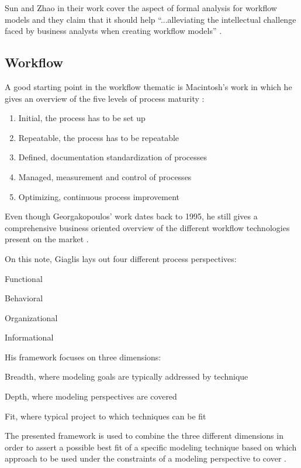 \documentclass{seal_thesis}
\begin{document}
Sun and Zhao in their work cover the aspect of formal analysis for workflow models and they claim that it should help ``...alleviating the intellectual challenge faced by business analysts when creating workflow models'' \cite{Sun2013}.

\subsection{Workflow}
\label{subsec:workflow}

A good starting point in the workflow thematic is Macintosh's work in which he gives an overview of the five levels of process maturity \cite{Macintosh1993}:

\begin{enumerate}
	\item Initial, the process has to be set up
	\item Repeatable, the process has to be repeatable
	\item Defined, documentation standardization of processes
	\item Managed, measurement and control of processes
	\item Optimizing, continuous process improvement
\end{enumerate}

Even though Georgakopoulos' work dates back to 1995, he still gives a comprehensive business oriented overview of the different workflow technologies present on the market \cite{Georgakopoulos1995}.

On this note, Giaglis lays out four different process perspectives:
\begin{enumerate*}
	\item Functional
	\item Behavioral
	\item Organizational
	\item Informational
\end{enumerate*}

His framework focuses on three dimensions:
\begin{enumerate*}
	\item Breadth, where modeling goals are typically addressed by technique
	\item Depth, where modeling perspectives are covered
	\item Fit, where typical project to which techniques can be fit
\end{enumerate*}

The presented framework is used to combine the three different dimensions in order to assert a possible best fit of a specific modeling technique based on which approach to be used under the constraints of a modeling perspective to cover \cite{Giaglis2001}.
\end{document}
